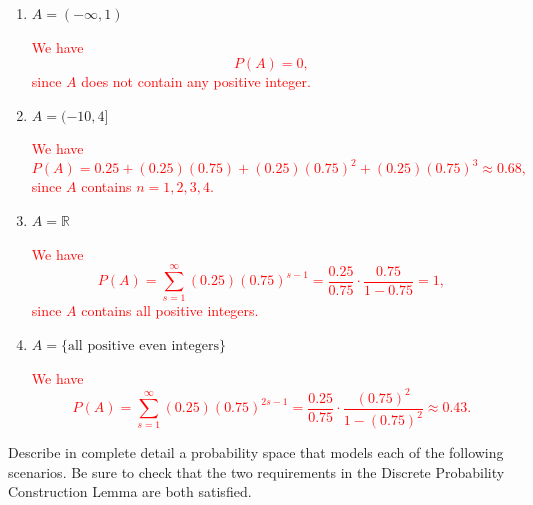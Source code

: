 \documentclass[12pt,reqno]{amsart}
\begin{document}
\medskip
\begin{enumerate}
\item $A = (-\infty,1)$
    
\bigskip
\textcolor{red}{We have
	\[
	P(A) = 0,
	\]
since $A$ does not contain any positive integer.}
\bigskip

\item $A = (-10, 4]$
    
\bigskip
\textcolor{red}{We have
	\[
	P(A) = 0.25 + (0.25)(0.75) + (0.25)(0.75)^2+ (0.25)(0.75)^3\approx 0.68,
	\]
since $A$ contains $n=1,2,3,4$.}
\bigskip

\item $A = \mathbb{R}$
    
\bigskip
\textcolor{red}{We have
        \[
        P(A) = \sum_{s=1}^\infty (0.25)(0.75)^{s-1} = \frac{0.25}{0.75} \cdot \frac{0.75}{1-0.75} = 1,
        \]
    since $A$ contains all positive integers.}
\bigskip
    
\item $A = \{\text{all positive even integers}\}$
    
\bigskip
\textcolor{red}{We have
	\[
	P(A) = \sum_{s=1}^\infty (0.25)(0.75)^{2s-1} = \frac{0.25}{0.75} \cdot \frac{(0.75)^2}{1-(0.75)^2} \approx 0.43.
	\]}
\end{enumerate}
















\bigskip
\prob Describe in complete detail a probability space that models each of the following scenarios. Be sure to check that the two requirements in the Discrete Probability Construction Lemma are both satisfied.
\end{document}

